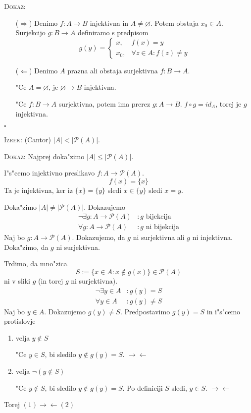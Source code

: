 \textsc{Dokaz:}
\begin{itemize}
	\item[($\Rightarrow$)] Denimo $f: A \to B$ injektivna in $A \neq \varnothing$. Potem obstaja $x_0 \in A$. Surjekcijo $g: B \to A$ definiramo s predpisom
	\begin{equation*}
	g(y) = \begin{cases}
	x, & f(x) = y \\
	x_0, & \forall z \in A: f(z) \neq y
	\end{cases}
	\end{equation*}
	
	\item[($\Leftarrow$)] Denimo $A$ prazna ali obstaja surjektivna $f: B \to A$.
	
	"Ce $A = \varnothing$, je $\varnothing \to B$ injektivna.
	
	"Ce $f: B \to A$ surjektivna, potem ima prerez $g: A \to B$. $f \circ g = id_A$, torej je $g$ injektivna.
\end{itemize}
\hfill $\square$

\textsc{Izrek:} (Cantor) $|A| < |\mathcal{P}(A)|$.

\textsc{Dokaz:} Najprej doka"zimo $|A| \leq |\mathcal{P}(A)|$.

I"s"cemo injektivno preslikavo $f: A \to \mathcal{P}(A)$.
\begin{equation*}
f (x) = \{x\}
\end{equation*}
Ta je injektivna, ker iz $\{x\} = \{y\}$ sledi $x \in \{y\}$ sledi $x = y$.

Doka"zimo $|A| \neq |\mathcal{P}(A)|$. Dokazujemo
\begin{align*}
\lnot \exists g : A \to \mathcal{P}(A)&: g \text{ bijekcija} \\
\forall g: A \to \mathcal{P}(A)&: g \text{ ni bijekcija}
\end{align*}
Naj bo $g: A \to \mathcal{P}(A)$. Dokazujemo, da $g$ ni surjektivna ali $g$ ni injektivna. Doka"zimo, da $g$ ni surjektivna.

Trdimo, da mno"zica
\begin{equation*}
S := \{x \in A: x \notin g(x)\} \in \mathcal{P}(A)
\end{equation*}
ni v sliki $g$ (in torej $g$ ni surjektivna).
\begin{align*}
\lnot \exists y \in A&: g(y) = S \\
\forall y \in A&: g(y) \neq S
\end{align*}
Naj bo $y \in A$. Dokazujemo $g(y) \neq S$. Predpostavimo $g(y) = S$ in i"s"cemo protislovje
\begin{enumerate}
	\item velja $y \notin S$
	
	"Ce $y \in S$, bi sledilo $y \notin g(y) = S$. $\rightarrow \leftarrow$
	
	\item velja $\lnot (y \notin S)$
	
	"Ce $y \notin S$, bi sledilo $y \notin g(y) = S$. Po definiciji $S$ sledi, $y \in S$. $\rightarrow \leftarrow$
\end{enumerate}
Torej $(1) \rightarrow \leftarrow (2)$
%
